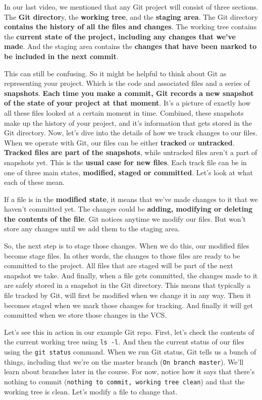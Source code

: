 	In our last video, we mentioned that any Git project will consist of three sections. The \textbf{Git director}y, the \textbf{working tree}, and the \textbf{staging area}. The Git directory \textbf{contains the history of all the files and changes}. The working tree contains the \textbf{current state of the project, including any changes that we've made}. And the staging area contains the \textbf{changes that have been marked to be included in the next commit}. 
	
	This can still be confusing. So it might be helpful to think about Git as representing your project. Which is the code and associated files and a series of \textbf{snapshots}. \textbf{Each time you make a commit, Git records a new snapshot of the state of your project at that moment}. It's a picture of exactly how all these files looked at a certain moment in time. Combined, these snapshots make up the history of your project, and it's information that gets stored in the Git directory. Now, let's dive into the details of how we track changes to our files. When we operate with Git, our files can be either \textbf{tracked} or \textbf{untracked}. \textbf{Tracked files are part of the snapshots}, while untracked files aren't a part of snapshots yet. This is the \textbf{usual case for new files}. Each track file can be in one of three main states, \textbf{modified, staged or committed}. Let's look at what each of these mean.
	
	If a file is in the \textbf{modified state}, it means that we've made changes to it that we haven't committed yet. The changes could be \textbf{adding, modifying or deleting the contents of the file}. Git notices anytime we modify our files. But won't store any changes until we add them to the staging area.

	So, the next step is to stage those changes. When we do this, our modified files become stage files. In other words, the changes to those files are ready to be committed to the project. 
	All files that are staged will be part of the next snapshot we take. 
	And finally, when a file gets committed, the changes made to it are safely stored in a snapshot in the Git directory. 
	This means that typically a file tracked by Git, will first be modified when we change it in any way. 
	Then it becomes staged when we mark those changes for tracking. 
	And finally it will get committed when we store those changes in the VCS. 

	Let's see this in action in our example Git repo. 
	First, let's check the contents of the current working tree using \verb|ls -l|. And then the current status of our files using the \texttt{git status} command. When we run Git status, Git tells us a bunch of things, including that we're on the master branch (\texttt{On branch master}). We'll learn about branches later in the course. For now, notice how it says that there's nothing to commit (\texttt{nothing to commit, working tree clean}) and that the working tree is clean. Let's modify a file to change that.
	

